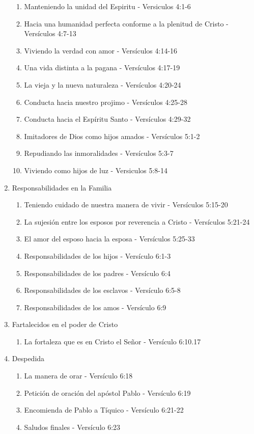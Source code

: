\documentclass[9pt,letterpaper]{article}
\begin{document}
\begin{enumerate}
		\begin{enumerate}			
			\item Manteniendo la unidad del Espiritu - Versiculos 4:1-6			 
			\item Hacia una humanidad perfecta conforme a la plenitud de Cristo - Versículos 4:7-13
			\item Viviendo la verdad con amor - Versículos 4:14-16
			\item Una vida distinta a la pagana - Versículos 4:17-19
			\item La vieja y la nueva naturaleza - Versículos 4:20-24
			\item Conducta hacia nuestro projimo - Versículos 4:25-28
			\item Conducta hacia el Espíritu Santo - Versículos 4:29-32
			\item Imitadores de Dios como hijos amados - Versículos 5:1-2
			\item Repudiando las inmoralidades - Versículos 5:3-7
			\item Viviendo como hijos de luz - Versiculos 5:8-14
		\end{enumerate}
			\item {\large Responsabilidades en la Familia}
		\begin{enumerate}
			\item Teniendo cuidado de nuestra manera de vivir - Versículos 5:15-20
			\item La sujesión entre los esposos por reverencia a Cristo - Versículos 5:21-24
			\item El amor del esposo hacia la esposa - Versículos 5:25-33
			\item Responsabilidades de los hijos - Versículo 6:1-3
			\item Responsabilidades de los padres - Versículo 6:4
			\item Responsabilidades de los esclavos - Versículo 6:5-8
			\item Responsabilidades de los amos - Versículo 6:9
		\end{enumerate}
		\item {\large Fartalecidos en el poder de Cristo}
		\begin{enumerate}			
			\item  La fortaleza que es en Cristo el Señor - Versículo 6:10.17		
		\end{enumerate}
		\item {\large Despedida}
		\begin{enumerate}
			\item La manera de orar - Versículo 6:18
			\item Petición de oración del apóstol Pablo - Versículo 6:19
			\item Encomienda de Pablo a Tíquico - Versículo 6:21-22
			\item Saludos finales - Versículo 6:23
		\end{enumerate}	
	\end{enumerate}
\end{document}
